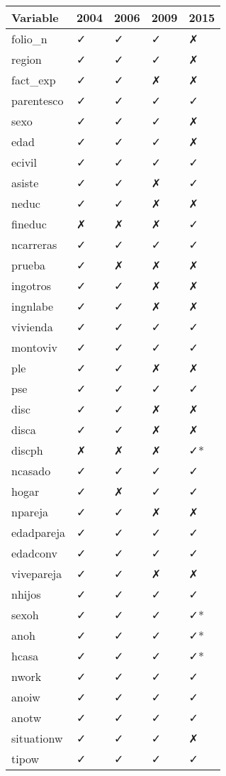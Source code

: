 \documentclass[
]{article}
\begin{document}
\begin{longtable}[]{@{}lllll@{}}
\toprule\noalign{}
Variable & 2004 & 2006 & 2009 & 2015 \\
\midrule\noalign{}
\endhead
\bottomrule\noalign{}
\endlastfoot
folio\_n & ✓ & ✓ & ✓ & ✗ \\
region & ✓ & ✓ & ✓ & ✗ \\
fact\_exp & ✓ & ✓ & ✗ & ✗ \\
parentesco & ✓ & ✓ & ✓ & ✓ \\
sexo & ✓ & ✓ & ✓ & ✗ \\
edad & ✓ & ✓ & ✓ & ✗ \\
ecivil & ✓ & ✓ & ✓ & ✓ \\
asiste & ✓ & ✓ & ✗ & ✓ \\
neduc & ✓ & ✓ & ✗ & ✗ \\
fineduc & ✗ & ✗ & ✗ & ✓ \\
ncarreras & ✓ & ✓ & ✓ & ✓ \\
prueba & ✓ & ✗ & ✗ & ✗ \\
ingotros & ✓ & ✓ & ✗ & ✗ \\
ingnlabe & ✓ & ✓ & ✗ & ✗ \\
vivienda & ✓ & ✓ & ✓ & ✓ \\
montoviv & ✓ & ✓ & ✓ & ✓ \\
ple & ✓ & ✓ & ✗ & ✗ \\
pse & ✓ & ✓ & ✓ & ✓ \\
disc & ✓ & ✓ & ✗ & ✗ \\
disca & ✓ & ✓ & ✗ & ✗ \\
discph & ✗ & ✗ & ✗ & ✓* \\
ncasado & ✓ & ✓ & ✓ & ✓ \\
hogar & ✓ & ✗ & ✓ & ✓ \\
npareja & ✓ & ✓ & ✗ & ✗ \\
edadpareja & ✓ & ✓ & ✓ & ✓ \\
edadconv & ✓ & ✓ & ✓ & ✓ \\
vivepareja & ✓ & ✓ & ✗ & ✗ \\
nhijos & ✓ & ✓ & ✓ & ✓ \\
sexoh & ✓ & ✓ & ✓ & ✓* \\
anoh & ✓ & ✓ & ✓ & ✓* \\
hcasa & ✓ & ✓ & ✓ & ✓* \\
nwork & ✓ & ✓ & ✓ & ✓ \\
anoiw & ✓ & ✓ & ✓ & ✓ \\
anotw & ✓ & ✓ & ✓ & ✓ \\
situationw & ✓ & ✓ & ✓ & ✗ \\
tipow & ✓ & ✓ & ✓ & ✓ \\

\end{longtable}
\end{document}
